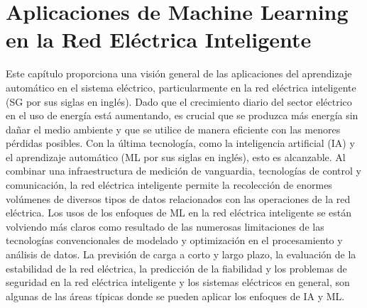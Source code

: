 \documentclass[crop=false]{standalone}
\begin{document}
\section{Aplicaciones de Machine Learning en la Red Eléctrica Inteligente}
Este capítulo proporciona una visión general de las aplicaciones del aprendizaje automático en el sistema eléctrico, particularmente en la red eléctrica inteligente (SG por sus siglas en inglés). Dado que el crecimiento diario del sector eléctrico en el uso de energía está aumentando, es crucial que se produzca más energía sin dañar el medio ambiente y que se utilice de manera eficiente con las menores pérdidas posibles. Con la última tecnología, como la inteligencia artificial (IA) y el aprendizaje automático (ML por sus siglas en inglés), esto es alcanzable. Al combinar una infraestructura de medición de vanguardia, tecnologías de control y comunicación, la red eléctrica inteligente permite la recolección de enormes volúmenes de diversos tipos de datos relacionados con las operaciones de la red eléctrica. Los usos de los enfoques de ML en la red eléctrica inteligente se están volviendo más claros como resultado de las numerosas limitaciones de las tecnologías convencionales de modelado y optimización en el procesamiento y análisis de datos. La previsión de carga a corto y largo plazo, la evaluación de la estabilidad de la red eléctrica, la predicción de la fiabilidad y los problemas de seguridad en la red eléctrica inteligente y los sistemas eléctricos en general, son algunas de las áreas típicas donde se pueden aplicar los enfoques de IA y ML.
\end{document}

